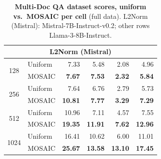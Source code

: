 \begin{table}[tp]
\begin{tabular}{@{} c l rrrr @{}}
    \midrule
    \multicolumn{6}{c}{\textbf{L2Norm (Mistral)}} \\
    \midrule
    \multirow{2}{*}{128} & Uniform & 7.33 & 5.48 & 2.08 & 4.96 \\
     & MOSAIC & \textbf{7.67} & \textbf{7.53} & \textbf{2.32} & \textbf{5.84} \\
    \cmidrule(l){1-6}
    \multirow{2}{*}{256} & Uniform & 7.64 & 6.76 & 2.79 & 5.73 \\
     & MOSAIC & \textbf{10.81} & \textbf{7.77} & \textbf{3.29} & \textbf{7.29} \\
    \cmidrule(l){1-6}
    \multirow{2}{*}{512} & Uniform & 10.96 & 7.11 & 4.57 & 7.55 \\
     & MOSAIC & \textbf{19.35} & \textbf{11.91} & \textbf{7.62} & \textbf{12.96} \\
    \cmidrule(l){1-6}
    \multirow{2}{*}{1024} & Uniform & 16.41 & 10.62 & 6.00 & 11.01 \\
     & MOSAIC & \textbf{25.67} & \textbf{13.58} & \textbf{13.10} & \textbf{17.45} \\
    \bottomrule
  \end{tabular}
  \caption{\textbf{Multi-Doc QA dataset scores, uniform vs.\ MOSAIC per cell} (full data). L2Norm (Mistral): Mistral-7B-Instruct-v0.2; other rows Llama-3-8B-Instruct.}
  \label{tab:app-lb-MULTI_DOCUMENT_QA}
\end{table}

